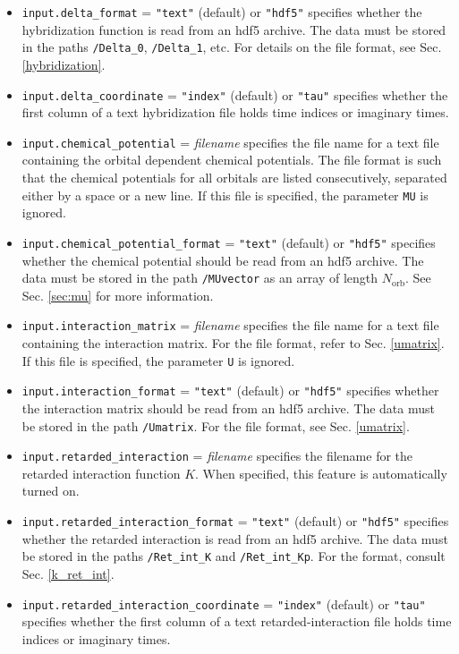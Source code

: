 \documentclass[aps,prb,floatfix,superscriptaddress,twocolumn,notitlepage]{revtex4-1}
\begin{document}
\begin{itemize}
\item \verb#input.delta_format# = \verb#"text"# (default) or \verb#"hdf5"# specifies whether the hybridization function is read from an hdf5 archive. The data must be stored in the paths \verb#/Delta_0#, \verb#/Delta_1#, etc. For details on the file format, see Sec. \ref{hybridization}.

\item \verb#input.delta_coordinate# = \verb#"index"# (default) or \verb#"tau"# specifies whether the first column of a text hybridization file holds time indices or imaginary times.

\item \verb#input.chemical_potential# = \emph{filename} specifies the file name for a text file containing the orbital dependent chemical potentials. The file format is such that the chemical potentials for all orbitals are listed consecutively, separated either by a space or a new line. If this file is specified, the parameter \verb#MU# is ignored.

\item \verb#input.chemical_potential_format# = \verb#"text"# (default) or \verb#"hdf5"# specifies whether the chemical potential should be read from an hdf5 archive. The data must be stored in the path \verb#/MUvector# as an array of length $N_{\text{orb}}$. See Sec. \ref{sec:mu} for more information.

\item \verb#input.interaction_matrix# = \emph{filename} specifies the file name for a text file containing the interaction matrix. For the file format, refer to Sec. \ref{umatrix}. If this file is specified, the parameter \verb#U# is ignored.

\item \verb#input.interaction_format# = \verb#"text"# (default) or \verb#"hdf5"# specifies whether the interaction matrix should be read from an hdf5 archive. The data must be stored in the path \verb#/Umatrix#. For the file format, see Sec. \ref{umatrix}.

\item \verb#input.retarded_interaction# = \emph{filename} specifies the filename for the retarded interaction function $K$. When specified, this feature is automatically turned on.

\item \verb#input.retarded_interaction_format# = \verb#"text"# (default) or \verb#"hdf5"# specifies whether the retarded interaction is read from an hdf5 archive. The data must be stored in the paths \verb#/Ret_int_K# and \verb#/Ret_int_Kp#. For the format, consult Sec. \ref{k_ret_int}.

\item \verb#input.retarded_interaction_coordinate# = \verb#"index"# (default) or \verb#"tau"# specifies whether the first column of a text retarded-interaction file holds time indices or imaginary times.
\end{itemize}
\end{document}
